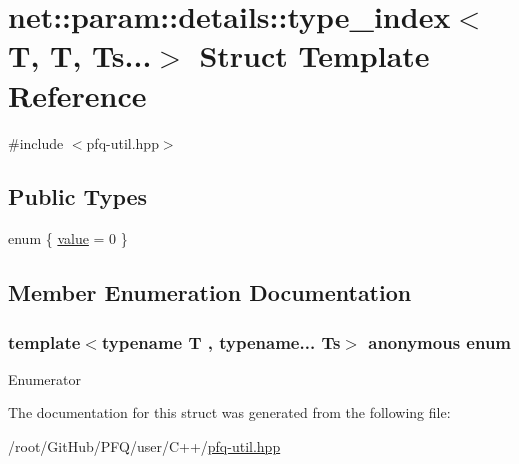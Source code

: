 \hypertarget{structnet_1_1param_1_1details_1_1type__index_3_01T_00_01T_00_01Ts_8_8_8_4}{\section{net\-:\-:param\-:\-:details\-:\-:type\-\_\-index$<$ T, T, Ts...$>$ Struct Template Reference}
\label{structnet_1_1param_1_1details_1_1type__index_3_01T_00_01T_00_01Ts_8_8_8_4}
}


{\ttfamily \#include $<$pfq-\/util.\-hpp$>$}

\subsection*{Public Types}
\begin{DoxyCompactItemize}
\item 
enum \{ \hyperlink{structnet_1_1param_1_1details_1_1type__index_3_01T_00_01T_00_01Ts_8_8_8_4_a040ee215ab90caaa7c12ce856e2d2b2eac990fbaa04445effd47d0e46691f994e}{value} = 0
 \}
\end{DoxyCompactItemize}


\subsection{Member Enumeration Documentation}
\hypertarget{structnet_1_1param_1_1details_1_1type__index_3_01T_00_01T_00_01Ts_8_8_8_4_a040ee215ab90caaa7c12ce856e2d2b2e}{\subsubsection[{anonymous enum}]{\setlength{\rightskip}{0pt plus 5cm}template$<$typename T , typename... Ts$>$ anonymous enum}}\label{structnet_1_1param_1_1details_1_1type__index_3_01T_00_01T_00_01Ts_8_8_8_4_a040ee215ab90caaa7c12ce856e2d2b2e}
\begin{Desc}
\item[Enumerator]\par
\begin{description}
\item[{\em 
\hypertarget{structnet_1_1param_1_1details_1_1type__index_3_01T_00_01T_00_01Ts_8_8_8_4_a040ee215ab90caaa7c12ce856e2d2b2eac990fbaa04445effd47d0e46691f994e}{value}\label{structnet_1_1param_1_1details_1_1type__index_3_01T_00_01T_00_01Ts_8_8_8_4_a040ee215ab90caaa7c12ce856e2d2b2eac990fbaa04445effd47d0e46691f994e}
}]\end{description}
\end{Desc}


The documentation for this struct was generated from the following file\-:\begin{DoxyCompactItemize}
\item 
/root/\-Git\-Hub/\-P\-F\-Q/user/\-C++/\hyperlink{pfq-util_8hpp}{pfq-\/util.\-hpp}\end{DoxyCompactItemize}
